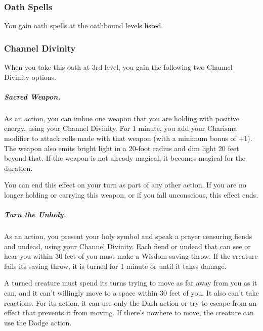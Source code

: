 \subsubsection{Oath Spells}

You gain oath spells at the oathbound levels listed.


\subsubsection{Channel Divinity}

When you take this oath at 3rd level, you gain the following two Channel Divinity options.

\subparagraph*{Sacred Weapon.} As an action, you can imbue one weapon that you are holding with positive energy, using your Channel Divinity. For 1 minute, you add your Charisma modifier to attack rolls made with that weapon (with a minimum bonus of +1). The weapon also emits bright light in a 20-foot radius and dim light 20 feet beyond that. If the weapon is not already magical, it becomes magical for the duration.

You can end this effect on your turn as part of any other action. If you are no longer holding or carrying this weapon, or if you fall unconscious, this effect ends.

\subparagraph*{Turn the Unholy.} As an action, you present your holy symbol and speak a prayer censuring fiends and undead, using your Channel Divinity. Each fiend or undead that can see or hear you within 30 feet of you must make a Wisdom saving throw. If the creature fails its saving throw, it is turned for 1 minute or until it takes damage.

A turned creature must spend its turns trying to move as far away from you as it can, and it can't willingly move to a space within 30 feet of you. It also can't take reactions. For its action, it can use only the Dash action or try to escape from an effect that prevents it from moving. If there's nowhere to move, the creature can use the Dodge action.

